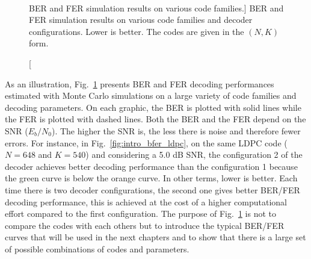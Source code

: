 \begin{figure}[htp]
  \centering
     \quad{}
    \quad{}
    \\
      \quad{}
   \quad{}
  \caption
    [BER and FER simulation results on various code families.]
    {BER and FER simulation results on various code families and decoder
    configurations. Lower is better. The codes are given in the $(N,K)$ form.}
  \label{fig:intro_bfer}
\end{figure}

As an illustration, Fig.~\ref{fig:intro_bfer} presents BER and FER decoding
performances estimated with Monte Carlo simulations on a large variety of code
families and decoding parameters. On each graphic, the BER is plotted with solid
lines while the FER is plotted with dashed lines. Both the BER and the FER
depend on the SNR ($E_b/N_0$). The higher the SNR is, the less there is noise
and therefore fewer errors. For instance, in Fig.~\ref{fig:intro_bfer_ldpc}, on
the same LDPC code ($N = 648$ and $K = 540$) and considering a 5.0 dB SNR, the
configuration 2 of the decoder achieves better decoding performance than the
configuration 1 because the {\color{Paired-3} green} curve is below the
{\color{Paired-7} orange} curve. In other terms, lower is better. Each time
there is two decoder configurations, the second one gives better BER/FER
decoding performance, this is achieved at the cost of a higher computational
effort compared to the first configuration. The purpose of
Fig.~\ref{fig:intro_bfer} is not to compare the codes with each others but to
introduce the typical BER/FER curves that will be used in the next chapters and
to show that there is a large set of possible combinations of codes and
parameters.

